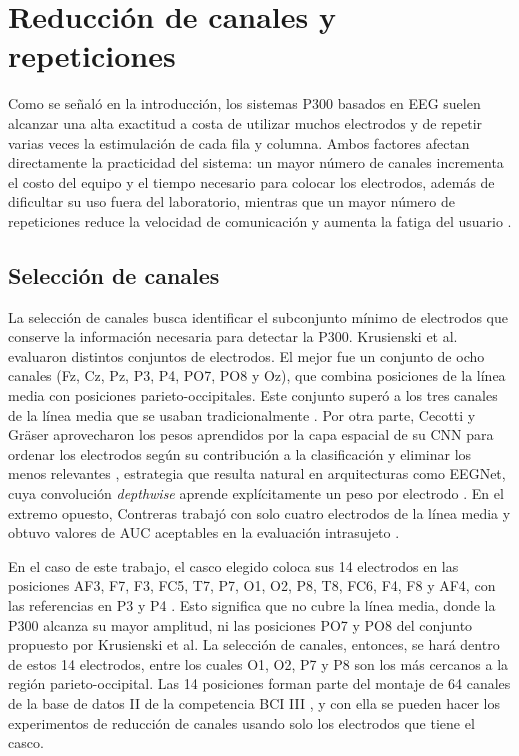 \section[REDUCCIÓN DE CANALES Y REPETICIONES]{Reducción de canales y repeticiones}

Como se señaló en la introducción, los sistemas P300 basados en EEG suelen alcanzar una alta
exactitud a costa de utilizar muchos electrodos y de repetir varias veces la estimulación de cada
fila y columna. Ambos factores afectan directamente la practicidad del sistema: un mayor número de
canales incrementa el costo del equipo y el tiempo necesario para colocar los electrodos, además de
dificultar su uso fuera del laboratorio, mientras que un mayor número de repeticiones reduce la
velocidad de comunicación y aumenta la fatiga del usuario \cite{krusienski2008,contreras2021}.

\subsection{Selección de canales}

La selección de canales busca identificar el subconjunto mínimo de electrodos que conserve la
información necesaria para detectar la P300. Krusienski et al. evaluaron distintos conjuntos de
electrodos. El mejor fue un conjunto de ocho canales (Fz, Cz, Pz, P3, P4, PO7, PO8 y Oz), que
combina posiciones de la línea media con posiciones parieto-occipitales. Este conjunto superó a los
tres canales de la línea media que se usaban tradicionalmente \cite{krusienski2008}.
Por otra parte, Cecotti y Gräser aprovecharon los pesos aprendidos por la capa espacial de su CNN
para ordenar los electrodos según su contribución a la clasificación y eliminar los menos
relevantes \cite{cecotti2011}, estrategia que resulta natural en arquitecturas como EEGNet, cuya
convolución \textit{depthwise} aprende explícitamente un peso por electrodo \cite{lawhern2018}. En
el extremo opuesto, Contreras trabajó con solo cuatro electrodos de la línea media y obtuvo valores
de AUC aceptables en la evaluación intrasujeto \cite{contreras2021}.

En el caso de este trabajo, el casco elegido coloca sus 14 electrodos en las posiciones AF3, F7,
F3, FC5, T7, P7, O1, O2, P8, T8, FC6, F4, F8 y AF4, con las referencias en P3 y P4
\cite{emotivepocx}. Esto significa que no cubre la línea media, donde la P300 alcanza su mayor
amplitud, ni las posiciones PO7 y PO8 del conjunto propuesto por Krusienski et al. La
selección de canales, entonces, se hará dentro de estos 14 electrodos, entre los cuales O1, O2, P7 y P8 son
los más cercanos a la región parieto-occipital. Las 14 posiciones forman parte del montaje de 64
canales de la base de datos II de la competencia BCI III \cite{blankertz2006}, y con ella se pueden hacer los
experimentos de reducción de canales usando solo los electrodos que tiene el casco.

